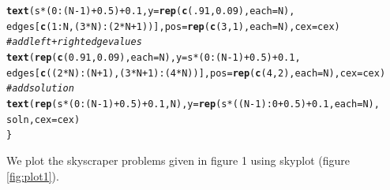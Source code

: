 \documentclass[12pt]{article}\usepackage[]{graphicx}\usepackage[]{color}
\makeatletter
\newcommand{\hlnum}[1]{\textcolor[rgb]{0.686,0.059,0.569}{#1}}%
\newcommand{\hlcom}[1]{\textcolor[rgb]{0.678,0.584,0.686}{\textit{#1}}}%
\newcommand{\hlopt}[1]{\textcolor[rgb]{0,0,0}{#1}}%
\newcommand{\hlstd}[1]{\textcolor[rgb]{0.345,0.345,0.345}{#1}}%
\newcommand{\hlkwc}[1]{\textcolor[rgb]{0.333,0.667,0.333}{#1}}%
\newcommand{\hlkwd}[1]{\textcolor[rgb]{0.737,0.353,0.396}{\textbf{#1}}}%
\newenvironment{kframe}{%
 \def\at@end@of@kframe{}%
 \ifinner\ifhmode%
  \def\at@end@of@kframe{\end{minipage}}%
  \begin{minipage}{\columnwidth}%
 \fi\fi%
 \def\FrameCommand##1{\hskip\@totalleftmargin \hskip-\fboxsep
 \colorbox{shadecolor}{##1}\hskip-\fboxsep
     \hskip-\linewidth \hskip-\@totalleftmargin \hskip\columnwidth}%
 \MakeFramed {\advance\hsize-\width
   \@totalleftmargin\z@ \linewidth\hsize
   \@setminipage}}%
 {\par\unskip\endMakeFramed%
 \at@end@of@kframe}
\newenvironment{knitrout}{}{} %
\makeatother
\begin{document}
\begin{knitrout}
\begin{kframe}
\begin{alltt}
  \hlkwd{text}\hlstd{( s}\hlopt{*}\hlstd{(}\hlnum{0}\hlopt{:}\hlstd{(N}\hlopt{-}\hlnum{1}\hlstd{)}\hlopt{+}\hlnum{0.5}\hlstd{)}\hlopt{+}\hlnum{0.1}\hlstd{,} \hlkwc{y}\hlstd{=}\hlkwd{rep}\hlstd{(}\hlkwd{c}\hlstd{(}\hlnum{.91}\hlstd{,} \hlnum{0.09}\hlstd{),}\hlkwc{each}\hlstd{=N),}
        \hlstd{edges[}\hlkwd{c}\hlstd{(}\hlnum{1}\hlopt{:}\hlstd{N,(}\hlnum{3}\hlopt{*}\hlstd{N)}\hlopt{:}\hlstd{(}\hlnum{2}\hlopt{*}\hlstd{N}\hlopt{+}\hlnum{1}\hlstd{))],} \hlkwc{pos} \hlstd{=} \hlkwd{rep}\hlstd{(}\hlkwd{c}\hlstd{(}\hlnum{3}\hlstd{,}\hlnum{1}\hlstd{),}\hlkwc{each}\hlstd{=N),} \hlkwc{cex} \hlstd{= cex )}
  \hlcom{#add left+right edge values}
  \hlkwd{text}\hlstd{(} \hlkwd{rep}\hlstd{(}\hlkwd{c}\hlstd{(}\hlnum{0.91}\hlstd{,}\hlnum{0.09}\hlstd{),}\hlkwc{each}\hlstd{=N),} \hlkwc{y}\hlstd{=s}\hlopt{*}\hlstd{(}\hlnum{0}\hlopt{:}\hlstd{(N}\hlopt{-}\hlnum{1}\hlstd{)}\hlopt{+}\hlnum{0.5}\hlstd{)}\hlopt{+}\hlnum{0.1}\hlstd{,}
        \hlstd{edges[}\hlkwd{c}\hlstd{((}\hlnum{2}\hlopt{*}\hlstd{N)}\hlopt{:}\hlstd{(N}\hlopt{+}\hlnum{1}\hlstd{),(}\hlnum{3}\hlopt{*}\hlstd{N}\hlopt{+}\hlnum{1}\hlstd{)}\hlopt{:}\hlstd{(}\hlnum{4}\hlopt{*}\hlstd{N))],} \hlkwc{pos} \hlstd{=} \hlkwd{rep}\hlstd{(}\hlkwd{c}\hlstd{(}\hlnum{4}\hlstd{,}\hlnum{2}\hlstd{),}\hlkwc{each}\hlstd{=N),} \hlkwc{cex} \hlstd{= cex )}
  \hlcom{#add solution}
  \hlkwd{text}\hlstd{(} \hlkwd{rep}\hlstd{(s}\hlopt{*}\hlstd{(}\hlnum{0}\hlopt{:}\hlstd{(N}\hlopt{-}\hlnum{1}\hlstd{)}\hlopt{+}\hlnum{0.5}\hlstd{)}\hlopt{+}\hlnum{0.1}\hlstd{, N),} \hlkwc{y}\hlstd{=}\hlkwd{rep}\hlstd{(s}\hlopt{*}\hlstd{((N}\hlopt{-}\hlnum{1}\hlstd{)}\hlopt{:}\hlnum{0}\hlopt{+}\hlnum{0.5}\hlstd{)}\hlopt{+}\hlnum{0.1}\hlstd{,} \hlkwc{each}\hlstd{=N),}
        \hlstd{soln,} \hlkwc{cex} \hlstd{= cex)}
\hlstd{\}}
\end{alltt}
\end{kframe}
\end{knitrout}
We plot the skyscraper problems given in figure 1 using skyplot (figure \ref{fig:plot1}).\\
\end{document}
